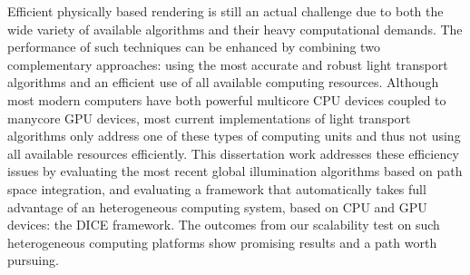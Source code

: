 Efficient physically based rendering is still an actual challenge due to both the wide variety of available algorithms and their heavy computational demands. The performance of such techniques can be enhanced by combining two complementary approaches: using the most accurate and robust light transport algorithms and an efficient use of all available computing resources. Although most modern computers have both powerful multicore CPU devices coupled to manycore GPU devices, most current implementations of light transport algorithms only address one of these types of computing units and thus not using all available resources efficiently. This dissertation work addresses these efficiency issues by evaluating the most recent global illumination algorithms based on path space integration, and evaluating a framework that automatically takes full advantage of an heterogeneous computing system, based on CPU and GPU devices: the DICE framework. The outcomes from our scalability test on such heterogeneous computing platforms show promising results and a path worth pursuing.
